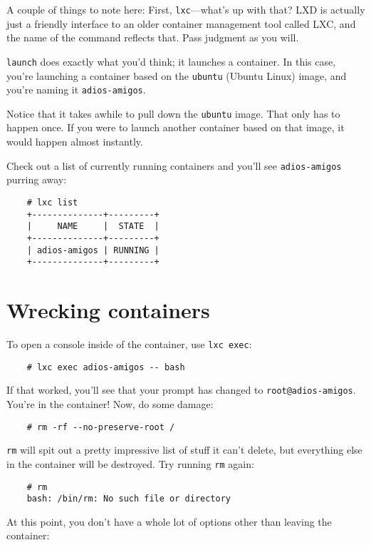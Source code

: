 A couple of things to note here: First, \texttt{lxc}---what's up with that? LXD is actually just a friendly interface to an older container management tool called LXC, and the name of the command reflects that. Pass judgment as you will.

\texttt{launch} does exactly what you'd think; it launches a container. In this case, you're launching a container based on the \texttt{ubuntu} (Ubuntu Linux) image, and you're naming it \texttt{adios-amigos}.

Notice that it takes awhile to pull down the \texttt{ubuntu} image. That only has to happen once. If you were to launch another container based on that image, it would happen almost instantly.

Check out a list of currently running containers and you'll see \texttt{adios-amigos} purring away:

\begin{verbatim}
    # lxc list
    +--------------+---------+
    |     NAME     |  STATE  |
    +--------------+---------+
    | adios-amigos | RUNNING |
    +--------------+---------+
\end{verbatim}

\section*{Wrecking containers}

To open a console inside of the container, use \texttt{lxc exec}:

\begin{verbatim}
    # lxc exec adios-amigos -- bash
\end{verbatim}

If that worked, you'll see that your prompt has changed to \texttt{root@adios-amigos}. You're in the container! Now, do some damage:

\begin{verbatim}
    # rm -rf --no-preserve-root /
\end{verbatim}

\texttt{rm} will spit out a pretty impressive list of stuff it can't delete, but everything else in the container will be destroyed. Try running \texttt{rm} again:

\begin{verbatim}
    # rm
    bash: /bin/rm: No such file or directory
\end{verbatim}

At this point, you don't have a whole lot of options other than leaving the container:


